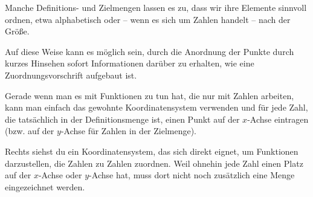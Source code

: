 \documentclass[../../main.tex]{subfiles}
\begin{document}
Manche Definitions- und Zielmengen lassen es zu, dass wir ihre Elemente sinnvoll ordnen, etwa alphabetisch oder -- wenn es sich um Zahlen handelt -- nach der Größe.

Auf diese Weise kann es möglich sein, durch die Anordnung der Punkte durch kurzes Hinsehen sofort Informationen darüber zu erhalten, wie eine Zuordnungsvorschrift aufgebaut ist. 


Gerade wenn man es mit Funktionen zu tun hat, die nur mit Zahlen arbeiten, kann man einfach das gewohnte Koordinatensystem verwenden und für jede Zahl, die tatsächlich in der Definitionsmenge ist, einen Punkt auf der $x$-Achse eintragen (bzw. auf der $y$-Achse für Zahlen in der Zielmenge).

Rechts siehst du ein Koordinatensystem, das sich direkt eignet, um Funktionen darzustellen, die Zahlen zu Zahlen zuordnen. Weil ohnehin jede Zahl einen Platz auf der $x$-Achse oder $y$-Achse hat, muss dort nicht noch zusätzlich eine Menge eingezeichnet werden.
\end{document}
